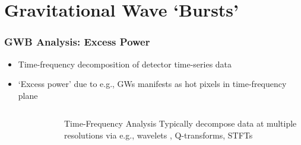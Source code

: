 \documentclass{beamer}
\begin{document}
\section{Gravitational Wave `Bursts'}

\begin{frame}
    \frametitle{GWB Analysis: Excess Power}
    \begin{itemize}
        \item Time-frequency decomposition of detector time-series data 
        \item `Excess power' due to e.g., GWs manifests as hot pixels in
            time-frequency plane
    \end{itemize}

    \begin{columns}[]
        \begin{figure}
        \end{figure}
        \begin{block}{Time-Frequency Analysis}
            Typically decompose data at multiple resolutions via e.g., wavelets
            , Q-transforms, STFTs%
        \end{block}
    \end{columns}

\end{frame}
\end{document}
